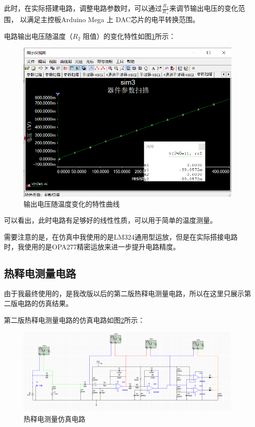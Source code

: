 \documentclass{article}
\begin{document}
\begin{spacing}{1.5}
    此时，在实际搭建电路，调整电路参数时，可以通过$\frac{R_f}{R_+}$来调节输出电压的变化范围，
    以满足主控板Arduino Mega 上 DAC芯片的电平转换范围。

    电路输出电压随温度（$R_2$ 阻值）的变化特性如图\ref{fig:sim3_result3}所示：
    
    \begin{figure}[H]
        \centering
        \includegraphics[scale=0.4]{fig/sim/sim3_result3.png}
        \caption{输出电压随温度变化的特性曲线}
        \label{fig:sim3_result3}
    \end{figure}
    
    可以看出，此时电路有足够好的线性性质，可以用于简单的温度测量。
    
    需要注意的是，在仿真中我使用的是LM324通用型运放，但是在实际搭接电路时，我使用的是OPA277精密运放来进一步提升电路精度。

    \subsection{热释电测量电路}

    由于我最终使用的，是我改版以后的第二版热释电测量电路，所以在这里只展示第二版电路的仿真结果。

    第二版热释电测量电路的仿真电路如图\ref{fig:sim4}所示：

    \begin{figure}[H]
        \centering
        \includegraphics[scale=0.4]{fig/sim/sim4.png}
        \caption{热释电测量仿真电路}
        \label{fig:sim4}
    \end{figure}
    

\end{spacing}
\end{document}
